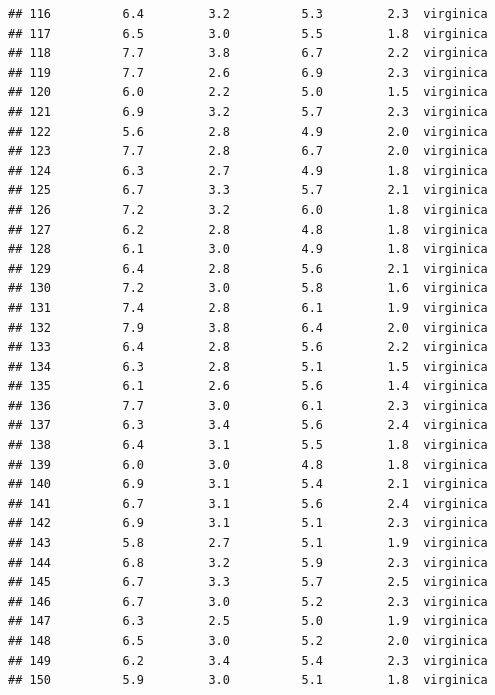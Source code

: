 \documentclass[
]{book}
\newenvironment{Shaded}{\begin{snugshade}}{\end{snugshade}}
\newcommand{\FunctionTok}[1]{\textcolor[rgb]{0.13,0.29,0.53}{\textbf{#1}}}
\newcommand{\NormalTok}[1]{#1}
\newcommand{\SpecialCharTok}[1]{\textcolor[rgb]{0.81,0.36,0.00}{\textbf{#1}}}
\theoremstyle{definition}
\theoremstyle{definition}
\theoremstyle{definition}
\theoremstyle{definition}
\theoremstyle{remark}
\begin{document}
\begin{verbatim}
## 116          6.4         3.2          5.3         2.3  virginica
## 117          6.5         3.0          5.5         1.8  virginica
## 118          7.7         3.8          6.7         2.2  virginica
## 119          7.7         2.6          6.9         2.3  virginica
## 120          6.0         2.2          5.0         1.5  virginica
## 121          6.9         3.2          5.7         2.3  virginica
## 122          5.6         2.8          4.9         2.0  virginica
## 123          7.7         2.8          6.7         2.0  virginica
## 124          6.3         2.7          4.9         1.8  virginica
## 125          6.7         3.3          5.7         2.1  virginica
## 126          7.2         3.2          6.0         1.8  virginica
## 127          6.2         2.8          4.8         1.8  virginica
## 128          6.1         3.0          4.9         1.8  virginica
## 129          6.4         2.8          5.6         2.1  virginica
## 130          7.2         3.0          5.8         1.6  virginica
## 131          7.4         2.8          6.1         1.9  virginica
## 132          7.9         3.8          6.4         2.0  virginica
## 133          6.4         2.8          5.6         2.2  virginica
## 134          6.3         2.8          5.1         1.5  virginica
## 135          6.1         2.6          5.6         1.4  virginica
## 136          7.7         3.0          6.1         2.3  virginica
## 137          6.3         3.4          5.6         2.4  virginica
## 138          6.4         3.1          5.5         1.8  virginica
## 139          6.0         3.0          4.8         1.8  virginica
## 140          6.9         3.1          5.4         2.1  virginica
## 141          6.7         3.1          5.6         2.4  virginica
## 142          6.9         3.1          5.1         2.3  virginica
## 143          5.8         2.7          5.1         1.9  virginica
## 144          6.8         3.2          5.9         2.3  virginica
## 145          6.7         3.3          5.7         2.5  virginica
## 146          6.7         3.0          5.2         2.3  virginica
## 147          6.3         2.5          5.0         1.9  virginica
## 148          6.5         3.0          5.2         2.0  virginica
## 149          6.2         3.4          5.4         2.3  virginica
## 150          5.9         3.0          5.1         1.8  virginica
\end{verbatim}

\begin{Shaded}
\end{Shaded}
\end{document}
